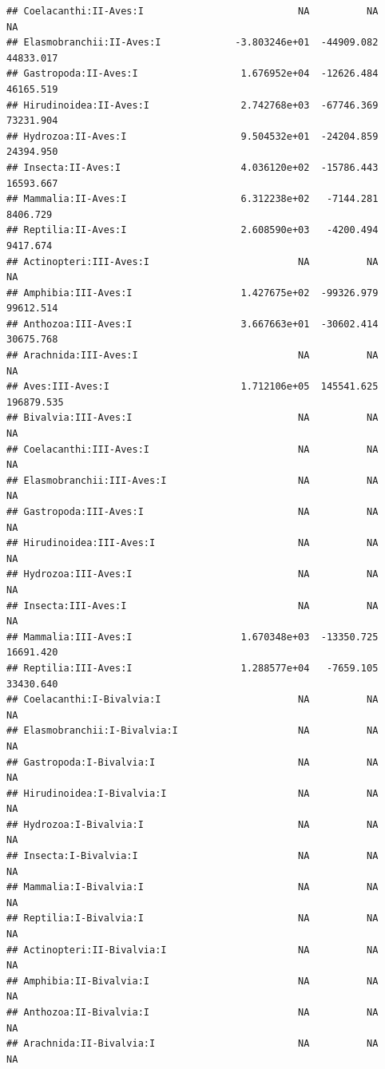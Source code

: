 \documentclass[
  12pt,
]{article}
\begin{document}
\begin{verbatim}
## Coelacanthi:II-Aves:I                           NA          NA          NA
## Elasmobranchii:II-Aves:I             -3.803246e+01  -44909.082   44833.017
## Gastropoda:II-Aves:I                  1.676952e+04  -12626.484   46165.519
## Hirudinoidea:II-Aves:I                2.742768e+03  -67746.369   73231.904
## Hydrozoa:II-Aves:I                    9.504532e+01  -24204.859   24394.950
## Insecta:II-Aves:I                     4.036120e+02  -15786.443   16593.667
## Mammalia:II-Aves:I                    6.312238e+02   -7144.281    8406.729
## Reptilia:II-Aves:I                    2.608590e+03   -4200.494    9417.674
## Actinopteri:III-Aves:I                          NA          NA          NA
## Amphibia:III-Aves:I                   1.427675e+02  -99326.979   99612.514
## Anthozoa:III-Aves:I                   3.667663e+01  -30602.414   30675.768
## Arachnida:III-Aves:I                            NA          NA          NA
## Aves:III-Aves:I                       1.712106e+05  145541.625  196879.535
## Bivalvia:III-Aves:I                             NA          NA          NA
## Coelacanthi:III-Aves:I                          NA          NA          NA
## Elasmobranchii:III-Aves:I                       NA          NA          NA
## Gastropoda:III-Aves:I                           NA          NA          NA
## Hirudinoidea:III-Aves:I                         NA          NA          NA
## Hydrozoa:III-Aves:I                             NA          NA          NA
## Insecta:III-Aves:I                              NA          NA          NA
## Mammalia:III-Aves:I                   1.670348e+03  -13350.725   16691.420
## Reptilia:III-Aves:I                   1.288577e+04   -7659.105   33430.640
## Coelacanthi:I-Bivalvia:I                        NA          NA          NA
## Elasmobranchii:I-Bivalvia:I                     NA          NA          NA
## Gastropoda:I-Bivalvia:I                         NA          NA          NA
## Hirudinoidea:I-Bivalvia:I                       NA          NA          NA
## Hydrozoa:I-Bivalvia:I                           NA          NA          NA
## Insecta:I-Bivalvia:I                            NA          NA          NA
## Mammalia:I-Bivalvia:I                           NA          NA          NA
## Reptilia:I-Bivalvia:I                           NA          NA          NA
## Actinopteri:II-Bivalvia:I                       NA          NA          NA
## Amphibia:II-Bivalvia:I                          NA          NA          NA
## Anthozoa:II-Bivalvia:I                          NA          NA          NA
## Arachnida:II-Bivalvia:I                         NA          NA          NA

\end{verbatim}
\end{document}

